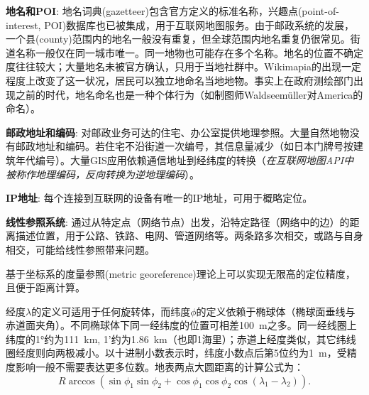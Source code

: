 \par \textbf{地名和POI}: 地名词典(gazetteer)包含官方定义的标准名称，兴趣点(point-of-interest, POI)数据库也已被集成，用于互联网地图服务。由于邮政系统的发展，一个县(county)范围内的地名一般没有重复，但全球范围内地名重复仍很常见。街道名称一般仅在同一城市唯一。同一地物也可能存在多个名称。地名的位置不确定度往往较大；大量地名未被官方确认，只用于当地社群中。Wikimapia的出现一定程度上改变了这一状况，居民可以独立地命名当地地物。事实上在政府测绘部门出现之前的时代，地名命名也是一种个体行为（如制图师Waldseem\"uller对America的命名）。

\par \textbf{邮政地址和编码}: 对邮政业务可达的住宅、办公室提供地理参照。大量自然地物没有邮政地址和编码。若住宅不沿街道一次编号，其信息量减少（如日本门牌号按建筑年代编号）。大量GIS应用依赖通信地址到经纬度的转换（\emph{在互联网地图API中被称作地理编码，反向转换为逆地理编码}）。

\par \textbf{IP地址}: 每个连接到互联网的设备有唯一的IP地址，可用于概略定位。

\par \textbf{线性参照系统}: 通过从特定点（网络节点）出发，沿特定路径（网络中的边）的距离描述位置，用于公路、铁路、电网、管道网络等。两条路多次相交，或路与自身相交，可能给线性参照带来问题。

\par 基于坐标系的度量参照(metric georeference)理论上可以实现无限高的定位精度，且便于距离计算。

\par 经度$\lambda$的定义可适用于任何旋转体，而纬度$\phi$的定义依赖于椭球体（椭球面垂线与赤道面夹角）。不同椭球体下同一经纬度的位置可相差\SI{100}{\metre}之多。同一经线圈上纬度的\ang{1}约为\SI{111}{\kilo\metre}, 1’约为\SI{1.86}{\kilo\metre}（也即1海里）；赤道上经度类似，其它纬线圈经度则向两极减小。以十进制小数表示时，纬度小数点后第5位约为\SI{1}{\metre}，受精度影响一般不需要表达更多位数。地表两点大圆距离的计算公式为：
\begin{displaymath}
R\arccos (\sin\phi_1 \sin \phi_2 +\cos \phi_1 \cos \phi_2 \cos(\lambda_1-\lambda_2)).
\end{displaymath}
